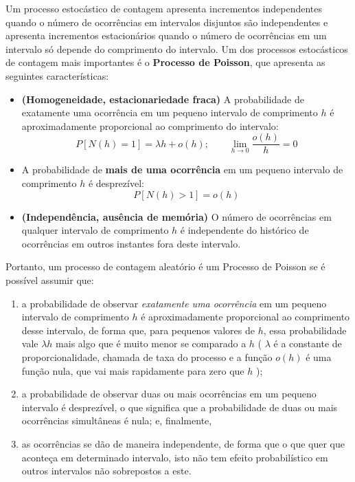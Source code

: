\documentclass[
]{book}
\theoremstyle{definition}
\theoremstyle{definition}
\theoremstyle{definition}
\theoremstyle{remark}
\begin{document}
Um processo estocástico de contagem apresenta incrementos independentes quando o número de ocorrências em intervalos disjuntos são independentes e apresenta incrementos estacionários quando o número de ocorrências em um intervalo só depende do comprimento do intervalo. Um dos processos estocásticos de contagem mais importantes é o \textbf{Processo de Poisson}, que apresenta as seguintes características:

\begin{itemize}
\item
  \textbf{(Homogeneidade, estacionariedade fraca)} A probabilidade de exatamente uma ocorrência em um pequeno intervalo de comprimento \(h\) é aproximadamente proporcional ao comprimento do intervalo:
  \[P[N(h) = 1] = \lambda h + o(h); \qquad \lim_{h \rightarrow 0}  \frac{o(h)}{h} = 0\]
\item
  A probabilidade de \textbf{mais de uma ocorrência} em um pequeno intervalo de comprimento \(h\) é desprezível:
  \[P[N(h) > 1] = o(h)\]
\item
  \textbf{(Independência, ausência de memória)} O número de ocorrências em qualquer intervalo de comprimento \(h\) é
  independente do histórico de ocorrências em outros instantes fora deste intervalo.
\end{itemize}

Portanto, um processo de contagem aleatório é um Processo de Poisson se é possível assumir que:

\begin{enumerate}
\def\labelenumi{(\roman{enumi})}
\item
  a probabilidade de observar \emph{exatamente uma ocorrência} em um pequeno intervalo de comprimento \(h\) é aproximadamente proporcional ao comprimento desse intervalo, de forma que, para pequenos valores de \(h\), essa probabilidade vale \(\lambda h\) mais algo que é muito menor se comparado a \(h\) ( \(\lambda\) é a constante de proporcionalidade, chamada de taxa do processo e
  a função \(o(h)\) é uma função nula, que vai mais rapidamente para zero que \(h\) );
\item
  a probabilidade de observar duas ou mais ocorrências em um pequeno intervalo é desprezível, o que significa que a probabilidade de duas ou mais ocorrências simultâneas é nula; e, finalmente,
\item
  as ocorrências se dão de maneira independente, de forma que o que quer que aconteça em determinado intervalo, isto não tem efeito probabilístico em outros intervalos não sobrepostos a este.
\end{enumerate}
\end{document}
